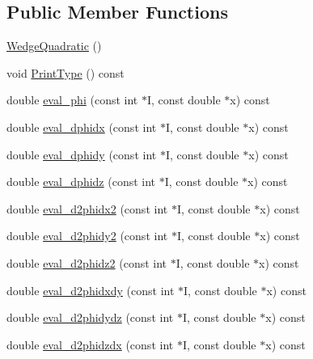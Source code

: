 \subsection*{Public Member Functions}
\begin{DoxyCompactItemize}
\item 
\mbox{\hyperlink{classfemus_1_1_wedge_quadratic_aa143ca4afebf03abdacbe97c32f0cc8a}{Wedge\+Quadratic}} ()
\item 
void \mbox{\hyperlink{classfemus_1_1_wedge_quadratic_a418fac73334350c6efa893644208de73}{Print\+Type}} () const
\item 
double \mbox{\hyperlink{classfemus_1_1_wedge_quadratic_a3b26fb7ddecdce25a52fd79cdff35c3f}{eval\+\_\+phi}} (const int $\ast$I, const double $\ast$x) const
\item 
double \mbox{\hyperlink{classfemus_1_1_wedge_quadratic_a57c70663dcb6cdda9adea4eeb93a75ba}{eval\+\_\+dphidx}} (const int $\ast$I, const double $\ast$x) const
\item 
double \mbox{\hyperlink{classfemus_1_1_wedge_quadratic_afc2bb550f1fc80835eb52bf6a628e8a1}{eval\+\_\+dphidy}} (const int $\ast$I, const double $\ast$x) const
\item 
double \mbox{\hyperlink{classfemus_1_1_wedge_quadratic_a7136bf2e3368d20821306b56ce653752}{eval\+\_\+dphidz}} (const int $\ast$I, const double $\ast$x) const
\item 
double \mbox{\hyperlink{classfemus_1_1_wedge_quadratic_a922cf0ab05ffd7f68a74dfaf0ad3f67e}{eval\+\_\+d2phidx2}} (const int $\ast$I, const double $\ast$x) const
\item 
double \mbox{\hyperlink{classfemus_1_1_wedge_quadratic_aeb0f88d015d9a6c4a44555d13eb4feff}{eval\+\_\+d2phidy2}} (const int $\ast$I, const double $\ast$x) const
\item 
double \mbox{\hyperlink{classfemus_1_1_wedge_quadratic_a1fe92bed37b71a6831d978a54868b922}{eval\+\_\+d2phidz2}} (const int $\ast$I, const double $\ast$x) const
\item 
double \mbox{\hyperlink{classfemus_1_1_wedge_quadratic_a023bc861013903cfda90cd78069c3d3c}{eval\+\_\+d2phidxdy}} (const int $\ast$I, const double $\ast$x) const
\item 
double \mbox{\hyperlink{classfemus_1_1_wedge_quadratic_a731f4fc4d70b8296ecaff5e7e70ef9f9}{eval\+\_\+d2phidydz}} (const int $\ast$I, const double $\ast$x) const
\item 
double \mbox{\hyperlink{classfemus_1_1_wedge_quadratic_a37fe1d3b6b3ec83d3f2e31319be5ba2d}{eval\+\_\+d2phidzdx}} (const int $\ast$I, const double $\ast$x) const
\end{DoxyCompactItemize}
